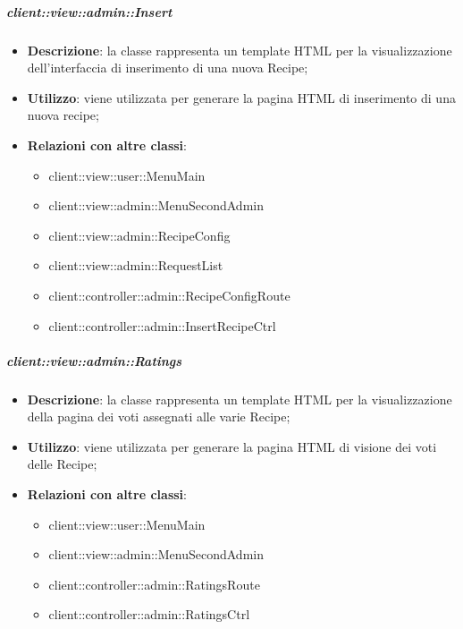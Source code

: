 		\subparagraph{client::view::admin::Insert} %
		\label{subp:bdsm_app_client_view_admin_insert}
			\begin{itemize}
				\item \textbf{Descrizione}: la classe rappresenta un template HTML per la visualizzazione dell'interfaccia di inserimento di una nuova Recipe;
				\item \textbf{Utilizzo}: viene utilizzata per generare la pagina HTML di inserimento di una nuova recipe;
				\item \textbf{Relazioni con altre classi}:
					\begin{itemize}
						\item client::view::user::MenuMain
						\item client::view::admin::MenuSecondAdmin
						\item client::view::admin::RecipeConfig
						\item client::view::admin::RequestList
						\item client::controller::admin::RecipeConfigRoute
						\item client::controller::admin::InsertRecipeCtrl
					\end{itemize}
			\end{itemize}

		\subparagraph{client::view::admin::Ratings} %
		\label{subp:bdsm_app_client_view_admin_ratings}
			\begin{itemize}
				\item \textbf{Descrizione}: la classe rappresenta un template HTML per la visualizzazione della pagina dei voti assegnati alle varie Recipe;
				\item \textbf{Utilizzo}: viene utilizzata per generare la pagina HTML di visione dei voti delle Recipe;
				\item \textbf{Relazioni con altre classi}:
					\begin{itemize}
						\item client::view::user::MenuMain
						\item client::view::admin::MenuSecondAdmin
						\item client::controller::admin::RatingsRoute
						\item client::controller::admin::RatingsCtrl
					\end{itemize}
			\end{itemize}

